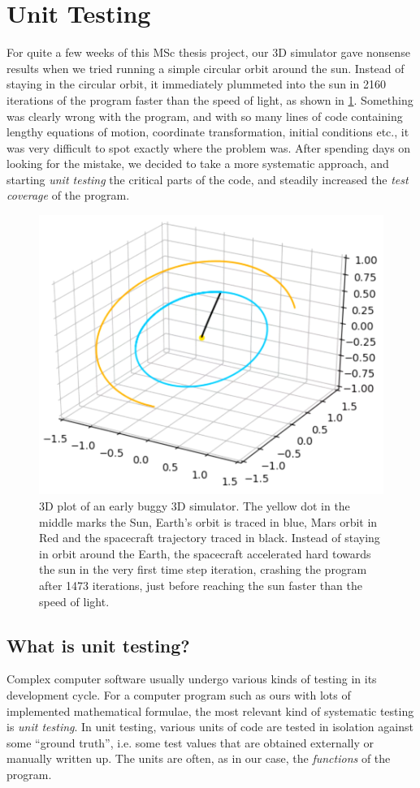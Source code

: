 \section{Unit Testing}
For quite a few weeks of this MSc thesis project, our 3D simulator gave nonsense results when we tried running a simple circular orbit around the sun. Instead of staying in the circular orbit, it immediately plummeted into the sun in 2160 iterations of the program faster than the speed of light, as shown in \cref{fig:r4b-bug}. Something was clearly wrong with the program, and with so many lines of code containing lengthy equations of motion, coordinate transformation, initial conditions etc., it was very difficult to spot exactly where the problem was. After spending days on looking for the mistake, we decided to take a more systematic approach, and starting \emph{unit testing} the critical parts of the code, and steadily increased the \emph{test coverage} of the program.

\begin{figure}[H]
    \centering
    \includegraphics[width=0.50\linewidth]{fig/r4b-bug.png}
    \caption{3D plot of an early buggy 3D simulator. The yellow dot in the middle marks the Sun, Earth's orbit is traced in blue, Mars orbit in Red and the spacecraft trajectory traced in black. Instead of staying in orbit around the Earth, the spacecraft accelerated hard towards the sun in the very first time step iteration, crashing the program after 1473 iterations, just before reaching the sun faster than the speed of light.}
    \label{fig:r4b-bug}
\end{figure}

\subsection{What is unit testing?}
Complex computer software usually undergo various kinds of testing in its development cycle. For a computer program such as ours with lots of implemented mathematical formulae, the most relevant kind of systematic testing is \emph{unit testing}. In unit testing, various units of code are tested in isolation against some ``ground truth'', i.e. some test values that are obtained externally or manually written up. The units are often, as in our case, the \emph{functions} of the program. 

